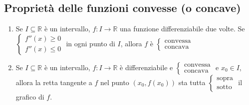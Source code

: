 \documentclass[a4paper]{article}
\theoremstyle{break}
\theoremstyle{break}
\theoremstyle{break}
\theoremstyle{break}
\begin{document}
\subsection{Proprietà delle funzioni convesse (o concave)}
\begin{enumerate}
  \item Se \( I \subseteq \mathbb{R} \) è un intervallo, \( f: I \to \mathbb{R} \) 
    una funzione differenziabile due volte. Se \( \begin{cases}
      f''(x) \ge 0\\
      f''(x) \le 0
      \end{cases} \) in ogni punto di \( I \), allora \( f \) è \( \begin{cases}
      \text{convessa}\\
      \text{concava}
    \end{cases} \) 
  \item Se \( I \subseteq \mathbb{R} \) è un intervallo, \( f: I \to \mathbb{R} \) è
    differenziabile e \( \begin{cases}
      \text{convessa}\\
      \text{concava}
    \end{cases} \) e \( x_0 \in I \), allora la retta tangente a \( f \) nel
    punto \( (x_0, f(x_0)) \) sta tutta \( \begin{cases}
      \text{sopra}\\
      \text{sotto}
    \end{cases} \) il grafico di \( f \). 
    \begin{figure}[H]
      \begin{center}
      \end{center}
    \end{figure}


\end{enumerate}
\end{document}
